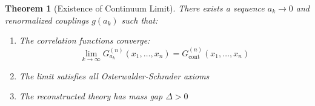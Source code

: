 \documentclass[11pt]{article}
\numberwithin{equation}{section}
\newtheorem{theorem}{Theorem}[section]
\theoremstyle{definition}
\theoremstyle{remark}
\begin{document}
\begin{theorem}[Existence of Continuum Limit]
\label{thm:continuum}
There exists a sequence $a_k \to 0$ and renormalized couplings $g(a_k)$ such that:
\begin{enumerate}
\item The correlation functions converge:
\begin{equation}
\lim_{k \to \infty} G_{a_k}^{(n)}(x_1,\ldots,x_n) = G^{(n)}_{\text{cont}}(x_1,\ldots,x_n)
\end{equation}
\item The limit satisfies all Osterwalder-Schrader axioms
\item The reconstructed theory has mass gap $\Delta > 0$
\end{enumerate}
\end{theorem}
\end{document}
